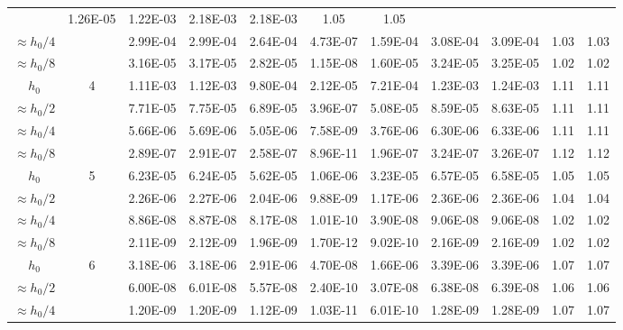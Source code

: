 \documentclass[compress]{beamer}
\begin{document}
\begin{frame}[shrink=16]
{\begin{tabular}{|cc|cc|ccc|cc|rr|}
 &   1.26E-05
 &   1.22E-03
 &   2.18E-03
 &   2.18E-03
 &     \alert{1.05}
 &     1.05
\\
      $\approx \! h_0/4$
 &
 &   2.99E-04
 &   2.99E-04
 &   2.64E-04
 &   4.73E-07
 &   1.59E-04
 &   3.08E-04
 &   3.09E-04
 &     \alert{1.03}
 &     1.03
\\
      $\approx \! h_0/8$
 &
 &   3.16E-05
 &   3.17E-05
 &   2.82E-05
 &   1.15E-08
 &   1.60E-05
 &   3.24E-05
 &   3.25E-05
 &     \alert{1.02}
 &     1.02
\\
 \hline
 $h_0$
 &   \alert{4}
 &   1.11E-03
 &   1.12E-03
 &   9.80E-04
 &   2.12E-05
 &   7.21E-04
 &   1.23E-03
 &   1.24E-03
 &     \alert{1.11}
 &     1.11
\\
      $\approx \! h_0/2$
 &
 &   7.71E-05
 &   7.75E-05
 &   6.89E-05
 &   3.96E-07
 &   5.08E-05
 &   8.59E-05
 &   8.63E-05
 &     \alert{1.11}
 &     1.11
\\
      $\approx \! h_0/4$
 &
 &   5.66E-06
 &   5.69E-06
 &   5.05E-06
 &   7.58E-09
 &   3.76E-06
 &   6.30E-06
 &   6.33E-06
 &     \alert{1.11}
 &     1.11
\\
      $\approx \! h_0/8$
 &
 &   2.89E-07
 &   2.91E-07
 &   2.58E-07
 &   8.96E-11
 &   1.96E-07
 &   3.24E-07
 &   3.26E-07
 &     \alert{1.12}
 &     1.12
\\
 \hline
 $h_0$
 &   \alert{5}
 &   6.23E-05
 &   6.24E-05
 &   5.62E-05
 &   1.06E-06
 &   3.23E-05
 &   6.57E-05
 &   6.58E-05
 &     \alert{1.05}
 &     1.05
\\
      $\approx \! h_0/2$
 &
 &   2.26E-06
 &   2.27E-06
 &   2.04E-06
 &   9.88E-09
 &   1.17E-06
 &   2.36E-06
 &   2.36E-06
 &     \alert{1.04}
 &     1.04
\\
      $\approx \! h_0/4$
 &
 &   8.86E-08
 &   8.87E-08
 &   8.17E-08
 &   1.01E-10
 &   3.90E-08
 &   9.06E-08
 &   9.06E-08
 &     \alert{1.02}
 &     1.02
\\
      $\approx \! h_0/8$
 &
 &   2.11E-09
 &   2.12E-09
 &   1.96E-09
 &   1.70E-12
 &   9.02E-10
 &   2.16E-09
 &   2.16E-09
 &     \alert{1.02}
 &     1.02
\\
 \hline
 $h_0$
 &   \alert{6}
 &   3.18E-06
 &   3.18E-06
 &   2.91E-06
 &   4.70E-08
 &   1.66E-06
 &   3.39E-06
 &   3.39E-06
 &     \alert{1.07}
 &     1.07
\\
      $\approx \! h_0/2$
 &
 &   6.00E-08
 &   6.01E-08
 &   5.57E-08
 &   2.40E-10
 &   3.07E-08
 &   6.38E-08
 &   6.39E-08
 &     \alert{1.06}
 &     1.06
\\
      $\approx \! h_0/4$
 &
 &   1.20E-09
 &   1.20E-09
 &   1.12E-09
 &   1.03E-11
 &   6.01E-10
 &   1.28E-09
 &   1.28E-09
 &     \alert{1.07}
 &     1.07
\\
 \hline
 \end{tabular}
} %

\end{frame}
\end{document}
